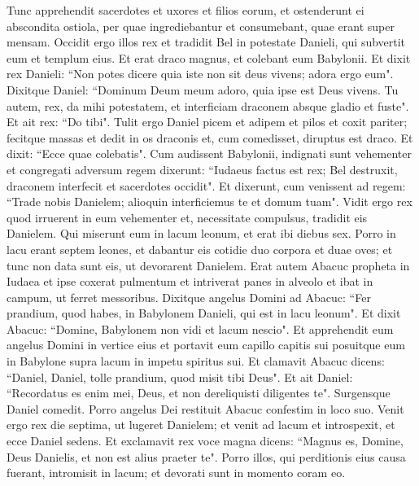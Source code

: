 \begin{biblechapter}
\verse Tunc apprehendit sacerdotes et uxores et filios eorum, et ostenderunt ei abscondita ostiola, per quae ingrediebantur et consumebant, quae erant super mensam. 
\verse Occidit ergo illos rex et tradidit Bel in potestate Danieli, qui subvertit eum et templum eius. 
\verse Et erat draco magnus, et colebant eum Babylonii. 
\verse Et dixit rex Danieli: “Non potes dicere quia iste non sit deus vivens; adora ergo eum". 
\verse Dixitque Daniel: “Dominum Deum meum adoro, quia ipse est Deus vivens. 
\verse Tu autem, rex, da mihi potestatem, et interficiam draconem absque gladio et fuste". Et ait rex: “Do tibi". 
\verse Tulit ergo Daniel picem et adipem et pilos et coxit pariter; fecitque massas et dedit in os draconis et, cum comedisset, diruptus est draco. Et dixit: “Ecce quae colebatis". 
\verse Cum audissent Babylonii, indignati sunt vehementer et congregati adversum regem dixerunt: “Iudaeus factus est rex; Bel destruxit, draconem interfecit et sacerdotes occidit". 
\verse Et dixerunt, cum venissent ad regem: “Trade nobis Danielem; alioquin interficiemus te et domum tuam". 
\verse Vidit ergo rex quod irruerent in eum vehementer et, necessitate compulsus, tradidit eis Danielem. 
\verse Qui miserunt eum in lacum leonum, et erat ibi diebus sex. 
\verse Porro in lacu erant septem leones, et dabantur eis cotidie duo corpora et duae oves; et tunc non data sunt eis, ut devorarent Danielem. 
\verse Erat autem Abacuc propheta in Iudaea et ipse coxerat pulmentum et intriverat panes in alveolo et ibat in campum, ut ferret messoribus. 
\verse Dixitque angelus Domini ad Abacuc: “Fer prandium, quod habes, in Babylonem Danieli, qui est in lacu leonum". 
\verse Et dixit Abacuc: “Domine, Babylonem non vidi et lacum nescio". 
\verse Et apprehendit eum angelus Domini in vertice eius et portavit eum capillo capitis sui posuitque eum in Babylone supra lacum in impetu spiritus sui. 
\verse Et clamavit Abacuc dicens: “Daniel, Daniel, tolle prandium, quod misit tibi Deus". 
\verse Et ait Daniel: “Recordatus es enim mei, Deus, et non dereliquisti diligentes te". 
\verse Surgensque Daniel comedit. Porro angelus Dei restituit Abacuc confestim in loco suo. 
\verse Venit ergo rex die septima, ut lugeret Danielem; et venit ad lacum et introspexit, et ecce Daniel sedens. 
\verse Et exclamavit rex voce magna dicens: “Magnus es, Domine, Deus Danielis, et non est alius praeter te". 
\verse Porro illos, qui perditionis eius causa fuerant, intromisit in lacum; et devorati sunt in momento coram eo.   
\end{biblechapter}
